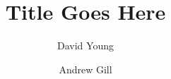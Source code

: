 \documentclass[acmsmall]{acmart}
\begin{document}
\title{Title Goes Here}

\author{David Young}


\author{Andrew Gill}









\end{document}
